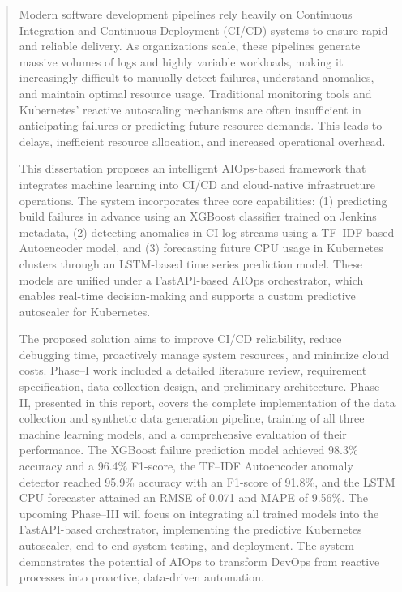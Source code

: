 \documentclass[12pt]{report}
\begin{document}
\clearpage
{}
\setcounter{page}{1}


\tableofcontents

\clearpage
\listoffigures
{}

\clearpage
\listoftables
{}

\clearpage

\begin{abstract}
\setcounter{page}{5}
\thispagestyle{plain}

Modern software development pipelines rely heavily on Continuous Integration and Continuous Deployment (CI/CD) systems to ensure rapid and reliable delivery. As organizations scale, these pipelines generate massive volumes of logs and highly variable workloads, making it increasingly difficult to manually detect failures, understand anomalies, and maintain optimal resource usage. Traditional monitoring tools and Kubernetes’ reactive autoscaling mechanisms are often insufficient in anticipating failures or predicting future resource demands. This leads to delays, inefficient resource allocation, and increased operational overhead.

This dissertation proposes an intelligent AIOps-based framework that integrates machine learning into CI/CD and cloud-native infrastructure operations. The system incorporates three core capabilities: (1) predicting build failures in advance using an XGBoost classifier trained on Jenkins metadata, (2) detecting anomalies in CI log streams using a TF–IDF based Autoencoder model, and (3) forecasting future CPU usage in Kubernetes clusters through an LSTM-based time series prediction model. These models are unified under a FastAPI-based AIOps orchestrator, which enables real-time decision-making and supports a custom predictive autoscaler for Kubernetes.

The proposed solution aims to improve CI/CD reliability, reduce debugging time, proactively manage system resources, and minimize cloud costs. Phase--I work included a detailed literature review, requirement specification, data collection design, and preliminary architecture. Phase--II, presented in this report, covers the complete implementation of the data collection and synthetic data generation pipeline, training of all three machine learning models, and a comprehensive evaluation of their performance. The XGBoost failure prediction model achieved 98.3\% accuracy and a 96.4\% F1-score, the TF--IDF Autoencoder anomaly detector reached 95.9\% accuracy with an F1-score of 91.8\%, and the LSTM CPU forecaster attained an RMSE of 0.071 and MAPE of 9.56\%. The upcoming Phase--III will focus on integrating all trained models into the FastAPI-based orchestrator, implementing the predictive Kubernetes autoscaler, end-to-end system testing, and deployment. The system demonstrates the potential of AIOps to transform DevOps from reactive processes into proactive, data-driven automation.

\end{abstract}
\end{document}
